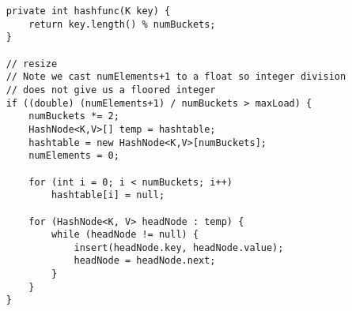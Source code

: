 \begin{solution}
\begin{lstlisting}
    private int hashfunc(K key) {
        return key.length() % numBuckets;
    }
    
    // resize
    // Note we cast numElements+1 to a float so integer division
    // does not give us a floored integer
    if ((double) (numElements+1) / numBuckets > maxLoad) {
        numBuckets *= 2;
        HashNode<K,V>[] temp = hashtable;
        hashtable = new HashNode<K,V>[numBuckets];
        numElements = 0;

        for (int i = 0; i < numBuckets; i++) 
            hashtable[i] = null;

        for (HashNode<K, V> headNode : temp) { 
            while (headNode != null) { 
                insert(headNode.key, headNode.value); 
                headNode = headNode.next; 
            } 
        }
    }


\end{lstlisting}
\end{solution}